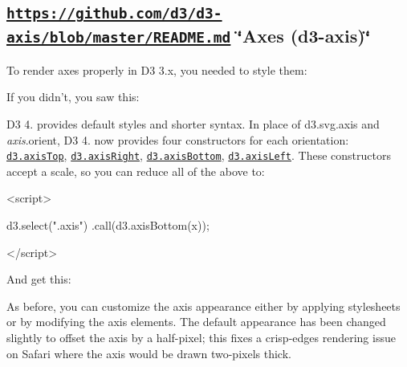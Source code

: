 \subsection*{\href{https://github.com/d3/d3-axis/blob/master/README.md}{\tt https\+://github.\+com/d3/d3-\/axis/blob/master/\+R\+E\+A\+D\+M\+E.\+md} \char`\"{}\+Axes (d3-\/axis)\char`\"{}}

To render axes properly in D3 3.\+x, you needed to style them\+:




If you didn’t, you saw this\+:



D3 4. provides default styles and shorter syntax. In place of d3.\+svg.\+axis and {\itshape axis}.orient, D3 4. now provides four constructors for each orientation\+: \href{https://github.com/d3/d3-axis/blob/master/README.md#axisTop}{\tt d3.\+axis\+Top}, \href{https://github.com/d3/d3-axis/blob/master/README.md#axisRight}{\tt d3.\+axis\+Right}, \href{https://github.com/d3/d3-axis/blob/master/README.md#axisBottom}{\tt d3.\+axis\+Bottom}, \href{https://github.com/d3/d3-axis/blob/master/README.md#axisLeft}{\tt d3.\+axis\+Left}. These constructors accept a scale, so you can reduce all of the above to\+:


\begin{DoxyCode}
<script>

d3.select(".axis")
    .call(d3.axisBottom(x));

</script>
\end{DoxyCode}


And get this\+:



As before, you can customize the axis appearance either by applying stylesheets or by modifying the axis elements. The default appearance has been changed slightly to offset the axis by a half-\/pixel; this fixes a crisp-\/edges rendering issue on Safari where the axis would be drawn two-\/pixels thick.

